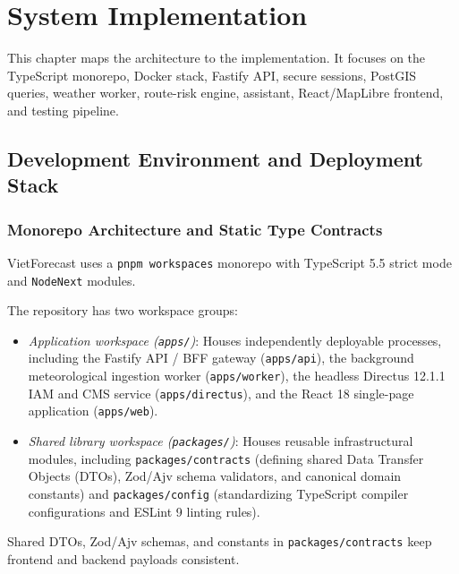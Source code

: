 \chapter{System Implementation}
\label{ch:implementation}

This chapter maps the architecture to the implementation. It focuses on the TypeScript monorepo, Docker stack, Fastify API, secure sessions, PostGIS queries, weather worker, route-risk engine, assistant, React/MapLibre frontend, and testing pipeline.

\section{Development Environment and Deployment Stack}
\label{sec:monorepo_deployment_stack}

\subsection{Monorepo Architecture and Static Type Contracts}
VietForecast uses a \texttt{pnpm workspaces} monorepo with TypeScript 5.5 strict mode and \texttt{NodeNext} modules.

The repository has two workspace groups:
\begin{itemize}
    \item[-] \textit{Application workspace (\texttt{apps/})}: Houses independently deployable processes, including the Fastify API / BFF gateway (\texttt{apps/api}), the background meteorological ingestion worker (\texttt{apps/worker}), the headless Directus 12.1.1 IAM and CMS service (\texttt{apps/directus}), and the React 18 single-page application (\texttt{apps/web}).
    \item[-] \textit{Shared library workspace (\texttt{packages/})}: Houses reusable infrastructural modules, including \texttt{packages/contracts} (defining shared Data Transfer Objects (DTOs), Zod/Ajv schema validators, and canonical domain constants) and \texttt{packages/config} (standardizing TypeScript compiler configurations and ESLint 9 linting rules).
\end{itemize}

Shared DTOs, Zod/Ajv schemas, and constants in \texttt{packages/contracts} keep frontend and backend payloads consistent.

